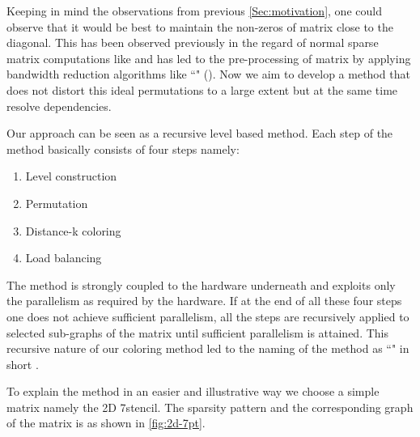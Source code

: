 Keeping in mind the observations from previous \cref{Sec:motivation}, one could observe that it would be best to maintain the non-zeros of matrix close to the diagonal. This has been observed previously in the regard of normal sparse matrix computations %
 like \SpMV and has led to the pre-processing of matrix by applying bandwidth reduction algorithms like ``\RCMfull" (\RCM). Now we aim to develop a method that does not distort this ideal permutations to a large extent but at the same time resolve \DK dependencies. 
 
Our approach can be seen as a recursive level based method. Each step of the method basically consists of four steps namely:
\begin{enumerate}
	\item Level construction
	\item Permutation
	\item Distance-k coloring
	\item Load balancing
\end{enumerate}
The method is strongly coupled to the hardware underneath and exploits only the parallelism as required by the hardware. If at the end of all these four steps one does not achieve sufficient parallelism, all the steps are recursively applied to selected sub-graphs of the matrix until sufficient parallelism is attained. This recursive nature of our coloring method led to the naming of the method as ``\RACEfull" in short \RACE.

To explain the method in an easier and illustrative way we choose a simple matrix namely the 2D 7\pt stencil. The sparsity pattern and the corresponding graph of the matrix is as shown in \cref{fig:2d-7pt}.

